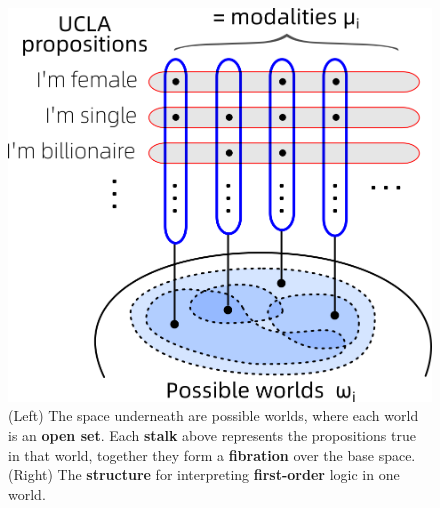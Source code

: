 \documentclass[runningheads]{llncs}
\begin{document}
\begin{figure}
	\includegraphics[scale=.5]{possible-worlds-as-sheaf.png} \qquad
	\caption{(Left) The space underneath are possible worlds, where each world is an \textbf{open set}. Each \textbf{stalk} above represents the propositions true in that world, together they form a \textbf{fibration} over the base space. (Right) The \textbf{structure} for interpreting \textbf{first-order} logic in one world.}
	\label{fig:possible-worlds-as-sheaf}
\end{figure}
\end{document}
